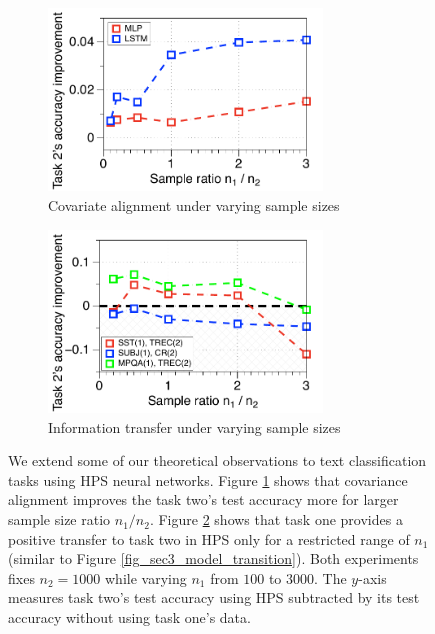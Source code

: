 \begin{figure}[!t]
	\begin{subfigure}[t]{0.5\textwidth}
		\centering
		\vspace{0pt}
		\includegraphics[width=0.8\textwidth]{figures/fig3b.pdf}
		\caption{Covariate alignment under varying sample sizes}
		\label{fig_ab_cov}
	\end{subfigure}\hfill
	\begin{subfigure}[t]{0.5\textwidth}
		\centering
		\vspace{0pt}
		\includegraphics[width=0.8\textwidth]{figures/fig3a.pdf}
		\caption{Information transfer under varying sample sizes}
		\label{fig_ab_data}
	\end{subfigure}
	\caption{
	We extend some of our theoretical observations to text classification tasks using HPS neural networks.
	Figure \ref{fig_ab_cov} shows that covariance alignment improves the task two's test accuracy more for larger sample size ratio $n_1 / n_2$.
 	Figure \ref{fig_ab_data} shows that task one provides a positive transfer to task two in HPS only for a restricted range of $n_1$ (similar to Figure \ref{fig_sec3_model_transition}).
    Both experiments fixes $n_2 = 1000$ while varying $n_1$ from $100$ to $3000$.
	The $y$-axis measures task two's test accuracy using HPS subtracted by its test accuracy without using task one's data.}
	\label{fig_text}
\end{figure}

